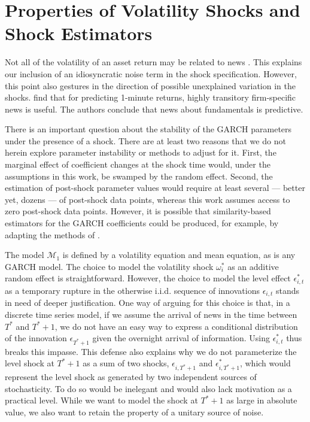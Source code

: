 \documentclass[11pt,3p,review,authoryear]{elsarticle}
\def\mc#1{\mathcal{#1}} %
\def\mc#1{\mathcal{#1}}
\theoremstyle{definition}
\begin{document}
\section{Properties of Volatility Shocks and Shock Estimators}\label{SVF_properties}

Not all of the volatility of an asset return may be related to news \citep{boudoukh2019information}.  This explains our inclusion of an idiosyncratic noise term in the shock specification.  However, this point also gestures in the direction of possible unexplained variation in the shocks.  \citet{chinco2019sparse} find that for predicting 1-minute returns, highly transitory firm-specific news is useful.  The authors conclude that news about fundamentals is predictive.

There is an important question about the stability of the GARCH parameters under the presence of a shock.  There are at least two reasons that we do not herein explore parameter instability or methods to adjust for it.  First, the marginal effect of coefficient changes at the shock time would, under the assumptions in this work, be swamped by the random effect.  Second, the estimation of post-shock parameter values would require at least several --- better yet, dozens --- of post-shock data points, whereas this work assumes access to zero post-shock data points.  However, it is possible that similarity-based estimators for the GARCH coefficients could be produced, for example, by adapting the methods of \citet{dendramis2020similarity}.

The model $\mc{M}_1$ is defined by a volatility equation and mean equation, as is any GARCH model.  The choice to model the volatility shock $\omega^{*}_{i}$ as an additive random effect is straightforward.  However, the choice to model the level effect $\epsilon^{*}_{i,t}$ as a temporary rupture in the otherwise i.i.d. sequence of innovations $\epsilon_{i,t}$ stands in need of deeper justification.  One way of arguing for this choice is that, in a discrete time series model, if we assume the arrival of news in the time between $T^{*}$ and $T^{*}+1$, we do not have an easy way to express a conditional distribution of the innovation $\epsilon_{T^{*}+1}$ given the overnight arrival of information.  Using $\epsilon^{*}_{i,t}$ thus breaks this impasse.  This defense also explains why we do not parameterize the level shock at $T^{*}+1$ as a sum of two shocks, $\epsilon_{i,T^{*}+1}$ and $\epsilon^{*}_{i,T^{*}+1}$, which would represent the level shock as generated by two independent sources of stochasticity.  To do so would be inelegant and would also lack motivation as a practical level.  While we want to model the shock at $T^{*}+1$ as large in absolute value, we also want to retain the property of a unitary source of noise.
\end{document}
